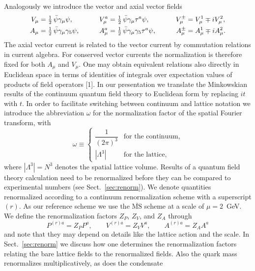 Analogously we introduce the vector and axial vector fields
\begin{equation}
\begin{aligned}
V_\mu &= \tfrac{1}{2}\,\bar{\psi}\gamma_\mu\psi , &\qquad
V_\mu^a &= \tfrac{1}{2}\,\bar{\psi}\gamma_\mu\tau^a\psi , &\qquad
V_\mu^\pm &= V_\mu^1 \mp i V_\mu^2 , \\
A_\mu &= \tfrac{1}{2}\,\bar{\psi}\gamma_\mu\gamma_5\psi , &\qquad
A_\mu^a &= \tfrac{1}{2}\,\bar{\psi}\gamma_\mu\gamma_5\tau^a\psi , &\qquad
A_\mu^\pm &= A_\mu^1 \mp i A_\mu^2 .
\end{aligned}
\end{equation}
The axial vector current is related to the vector current by commutation
relations in current algebra. For conserved vector currents the normalization
is therefore fixed for both $A_\mu$ and $V_\mu$.
One may obtain equivalent relations also directly in Euclidean space in
terms of identities of integrals over expectation values of products of field
operators [1]. In our presentation we translate the Minkowskian results of
the continuum quantum field theory to Euclidean form by replacing $it$ with
$t$. In order to facilitate switching between continuum and lattice notation we
introduce the abbreviation $\omega$ for the normalization factor of the spatial Fourier
transform, with
\begin{equation}
\omega \equiv
\begin{cases}
\dfrac{1}{(2\pi)^3} & \text{for the continuum}, \\[2mm]
|\Lambda^3| & \text{for the lattice},
\end{cases}
\end{equation}
where $|\Lambda^3| = N^3$ denotes the spatial lattice volume.
Results of a quantum field theory calculation need to be renormalized
before they can be compared to experimental numbers (see Sect.~\ref{sec:renorm}). We
denote quantities renormalized according to a continuum renormalization
scheme with a superscript $(r)$. As our reference scheme we use the
$\overline{\mathrm{MS}}$ scheme at a scale of $\mu = 2$~GeV. We define the renormalization factors $Z_P$, $Z_V$, and
$Z_A$ through
\begin{equation}
P^{(r)a} = Z_P P^a , \qquad
V^{(r)a} = Z_V V^a , \qquad
A^{(r)a} = Z_A A^a
\end{equation}
and note that they may depend on details like the lattice action and the
scale. In Sect.~\ref{sec:renorm} we discuss how one determines the renormalization factors
relating the bare lattice fields to the renormalized fields.
Also the quark mass renormalizes multiplicatively, as does the condensate

